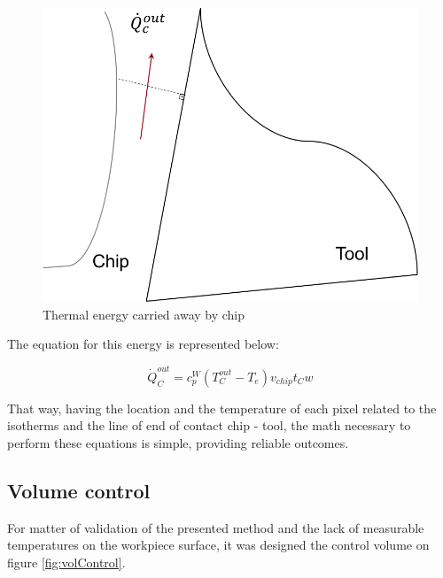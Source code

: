 	\begin{figure}[H]
		\centering
		\captionsetup{justification=centering}
		\includegraphics[scale=0.6]{Cap4/energyChip.png}
		\caption{Thermal energy carried away by chip}
		\label{fig:energychip}
	\end{figure}

	The equation for this energy is represented below:

	\begin{equation} 
	\label{eq_energychip}
		\dot{Q}_{C}^{out} = c_{p}^{W}(T_{C}^{out} - T_{e})v_{chip}t_{C}w
	\end{equation}

	That way, having the location and the temperature of each pixel related to the isotherms and the line of end of contact chip - tool, the math necessary to perform these equations is simple, providing reliable outcomes.

	\subsection{Volume control}

	For matter of validation of the presented method and the lack of measurable temperatures on the workpiece surface, it was designed the control volume on figure \ref{fig:volControl}.

